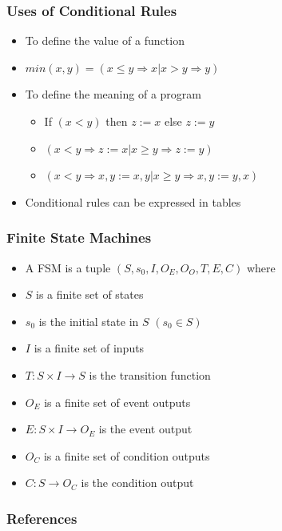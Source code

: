 \documentclass[t,12pt,numbers,fleqn]{beamer}
\begin{document}
\begin{frame}
\frametitle{Uses of Conditional Rules}
\begin{itemize}
\item To define the value of a function
\item $min(x,y) = (x \leq y \Rightarrow x | x > y \Rightarrow y)$
\item To define the meaning of a program
\begin{itemize}
\item If $(x < y)$ then $z := x$ else $z := y$
\item $(x < y \Rightarrow z := x | x \geq y \Rightarrow z:= y)$
\item $(x < y \Rightarrow x, y := x, y | x \geq y \Rightarrow x, y := y, x)$
\end{itemize}
\item Conditional rules can be expressed in tables
\end{itemize}
\end{frame}


\begin{frame}
\frametitle{Finite State Machines}
\begin{itemize}
\item A FSM is a tuple $(S, s_0, I, O_E, O_O, T, E, C)$ where
\item $S$ is a finite set of states
\item $s_0$ is the initial state in $S$ $(s_0 \in S)$
\item $I$ is a finite set of inputs
\item $T: S \times I \rightarrow S$ is the transition function
\item $O_E$ is a finite set of event outputs
\item $E: S\times I \rightarrow O_E$ is the event output
\item $O_C$ is a finite set of condition outputs
\item $C: S \rightarrow O_C$ is the condition output
\end{itemize}
\end{frame}


\begin{frame}[allowframebreaks]
\frametitle{References}



\end{frame}

\end{document}
